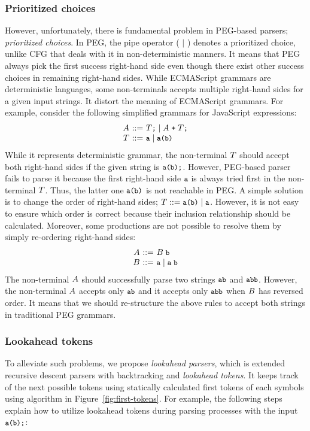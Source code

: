 \subsubsection{Prioritized choices}
However, unfortunately, there is fundamental problem in PEG-based parsers;
\textit{prioritized choices}.
In PEG, the pipe operator ( \( \mid \) ) denotes a prioritized choice,
unlike CFG that deals with it in non-deterministic manners.
It means that PEG always pick the first success right-hand side even though
there exist other success choices in remaining right-hand sides.
While ECMAScript grammars are deterministic languages, some non-terminals
accepts multiple right-hand sides for a given input strings.
It distort the meaning of ECMAScript grammars.
For example, consider the following simplified grammars for JavaScript expressions:
\[
  \begin{array}{r@{~}c@{~}l}
    \NT{A} &::=& \NT{T} \T{;} \mid \NT{A} \; \T{+} \; \NT{T} \T{;} \\
    \NT{T} &::=& \T{a} \mid \T{a} \T{(} \T{b} \T{)}\\
  \end{array}
\]
While it represents deterministic grammar, the non-terminal \( T \)
should accept both right-hand sides if the given string is \( \texttt{\small a(b);} \).
However, PEG-based parser fails to parse it
because the first right-hand side \( \texttt{\small a} \) is always tried
first in the non-terminal \( T \).
Thus, the latter one \( \texttt{\small a} \texttt{\small(} \texttt{\small b} \texttt{\small)} \) is not reachable in PEG.
A simple solution is to change the order of right-hand sides;
\( T ::= \texttt{\small a} \texttt{\small(} \texttt{\small b} \texttt{\small)} \mid \texttt{\small a} \).
However, it is not easy to ensure which order is correct
because their inclusion relationship should be calculated.
Moreover, some productions are not possible to resolve them
by simply re-ordering right-hand sides:
\[
  \begin{array}{r@{~}c@{~}l}
    \NT{A} &::=& \NT{B} \; \T{b}\\
    \NT{B} &::=& \T{a} \mid \T{a} \; \T{b}\\
  \end{array}
\]
The non-terminal \( A \) should successfully parse two strings \( \texttt{\small ab} \)
and \( \texttt{\small abb} \). However, the non-terminal \( A \) accepts only
\( \texttt{\small ab} \) and it accepts only \( \texttt{\small abb} \) when \( B \) has
reversed order. It means that we should re-structure
the above rules to accept both strings in traditional PEG grammars.

\subsubsection{Lookahead tokens}
To alleviate such problems, we propose \textit{lookahead parsers},
which is extended recursive descent parsers with backtracking and
\textit{lookahead tokens}.
It keeps track of the next possible tokens using statically
calculated first tokens of each symbols using algorithm in
Figure~\ref{fig:first-tokens}. For example, the following steps explain
how to utilize lookahead tokens during parsing processes with
the input \( \texttt{\small a(b);} \):


